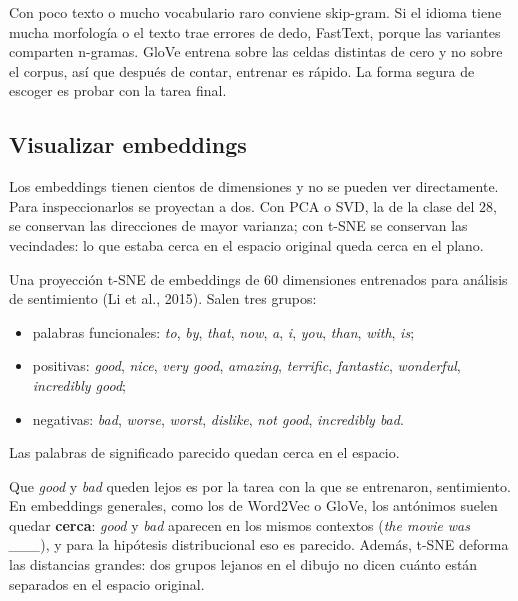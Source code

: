 \documentclass[11pt,letterpaper]{article}
\begin{document}
Con poco texto o mucho vocabulario raro conviene skip-gram. Si el
idioma tiene mucha morfología o el texto trae errores de dedo,
FastText, porque las variantes comparten n-gramas. GloVe entrena sobre
las celdas distintas de cero y no sobre el corpus, así que después de
contar, entrenar es rápido. La forma segura de escoger es probar con
la tarea final.


\subsection*{Visualizar embeddings}

Los embeddings tienen cientos de dimensiones y no se pueden ver
directamente. Para inspeccionarlos se proyectan a dos. Con PCA o SVD,
la de la clase del $28$, se conservan las direcciones de mayor
varianza; con t-SNE se conservan las vecindades: lo que estaba cerca en
el espacio original queda cerca en el plano.

\begin{ejemplo}[Diapositiva $53$]
    Una proyección t-SNE de embeddings de $60$ dimensiones entrenados
    para análisis de sentimiento (Li et al., 2015). Salen tres grupos:
    \begin{itemize}[itemsep=0.2em]
        \item palabras funcionales: \textit{to}, \textit{by},
              \textit{that}, \textit{now}, \textit{a}, \textit{i},
              \textit{you}, \textit{than}, \textit{with}, \textit{is};
        \item positivas: \textit{good}, \textit{nice},
              \textit{very good}, \textit{amazing}, \textit{terrific},
              \textit{fantastic}, \textit{wonderful},
              \textit{incredibly good};
        \item negativas: \textit{bad}, \textit{worse}, \textit{worst},
              \textit{dislike}, \textit{not good},
              \textit{incredibly bad}.
    \end{itemize}
    Las palabras de significado parecido quedan cerca en el espacio.
\end{ejemplo}

\begin{ojo}
    Que \textit{good} y \textit{bad} queden lejos es por la tarea con
    la que se entrenaron, sentimiento. En embeddings generales, como
    los de Word2Vec o GloVe, los antónimos suelen quedar
    \textbf{cerca}: \textit{good} y \textit{bad} aparecen en los mismos
    contextos (\textit{the movie was \_\_\_}), y para la hipótesis
    distribucional eso es parecido. Además, t-SNE deforma las
    distancias grandes: dos grupos lejanos en el dibujo no dicen cuánto
    están separados en el espacio original.
\end{ojo}
\end{document}
